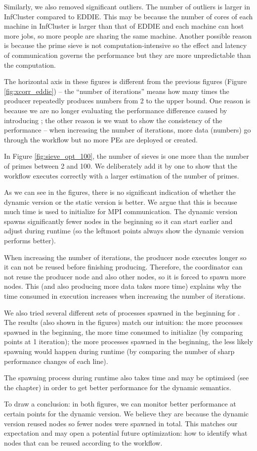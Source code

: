 Similarly, we also removed significant outliers. The number of outliers is larger in InfCluster compared to EDDIE. This may be because the number of cores of each machine in InfCluster is larger than that of EDDIE and each machine can host more jobs, so more people are sharing the same machine. Another possible reason is because the prime sieve is not computation-intensive so the effect and latency of communication governs the performance but they are more unpredictable than the computation.

The horizontal axis in these figures is different from the previous figures (\eg Figure \ref{fig:xcorr_eddie}) -- the ``number of iterations'' means how many times the producer repeatedly produces numbers from 2 to the upper bound. One reason is because we are no longer evaluating the performance difference caused by introducing \tincdep; the other reason is we want to show the consistency of the performance -- when increasing the number of iterations, more data (numbers) go through the workflow but no more PEs are deployed or created.

In Figure \ref{fig:sieve_opt_100}, the number of sieves is one more than the number of primes between 2 and 100. We deliberately add it by one to show that the workflow executes correctly with a larger estimation of the number of primes.

As we can see in the figures, there is no significant indication of whether the dynamic version or the static version is better. We argue that this is because much time is used to initialize for MPI communication. The dynamic version spawns significantly fewer nodes in the beginning so it can start earlier and adjust during runtime (so the leftmost points always show the dynamic version performs better). 

When increasing the number of iterations, the producer node executes longer so it can not be reused before finishing producing. Therefore, the coordinator can not reuse the producer node and also other nodes, so it is forced to spawn more nodes. This (and also producing more data takes more time) explains why the time consumed in execution increases when increasing the number of iterations.

We also tried several different sets of processes spawned in the beginning for \tdynexp. The results (also shown in the figures) match our intuition: the more processes spawned in the beginning, the more time consumed to initialize (by comparing points at 1 iteration); the more processes spawned in the beginning, the less likely spawning would happen during runtime (by comparing the number of sharp performance changes of each line).

The spawning process during runtime also takes time and may be optimised (see the  chapter) in order to get better performance for the dynamic semantics.

To draw a conclusion: in both figures, we can monitor better performance at certain points for the dynamic version. We believe they are because the dynamic version reused nodes so fewer nodes were spawned in total. This matches our expectation and may open a potential future optimization: how to identify what nodes that can be reused according to the workflow.

